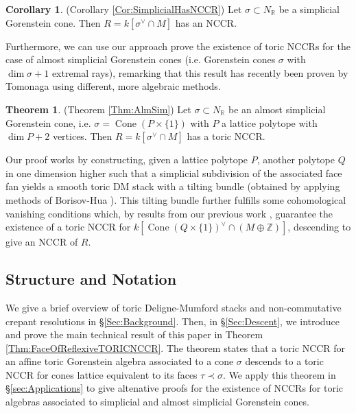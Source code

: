 \documentclass[reqno, 12pt]{amsart}
\theoremstyle{definition}
\newtheorem*{theorem*}{Theorem}
\newtheorem*{corollary*}{Corollary}
\numberwithin{equation}{section}
\newcommand{\newterm}{\textsf}
\newcommand{\Z}{\mathbb{Z}}
\newcommand{\R}{\mathbb{R}}
\newcommand{\cone}{\operatorname{Cone}}
\begin{document}
 \begin{corollary*}(Corollary \ref{Cor:SimplicialHasNCCR})
    Let $\sigma\subset N_{\R}$ be a simplicial Gorenstein cone. Then $R=k[\sigma^\vee\cap M]$ has an NCCR.
\end{corollary*}

Furthermore, we can use our approach prove the existence of toric NCCRs for the case of \newterm{almost simplicial} Gorenstein cones (i.e. Gorenstein cones $\sigma$ with $\dim \sigma+1$ extremal rays), remarking that this result has recently been proven by Tomonaga \cite{Tomo25} using different, more algebraic methods.

\begin{theorem*}(Theorem \ref{Thm:AlmSim})
    Let $\sigma\subset N_\R$ be an almost simplicial Gorenstein cone, i.e. $\sigma=\cone(P\times\{1\})$ with $P$ a lattice polytope with $\dim P+2$ vertices. Then $R=k[\sigma^\vee\cap M]$ has a toric NCCR.
\end{theorem*}

\noindent Our proof works by constructing, given a lattice polytope $P$, another polytope $Q$ in one dimension higher such that a simplicial subdivision of the associated face fan yields a smooth toric DM stack with a tilting bundle (obtained by applying methods of Borisov-Hua \cite{BH09}). This tilting bundle further fulfills some cohomological vanishing conditions which, by results from our previous work \cite{MS25}, guarantee the existence of a toric NCCR for $k[\cone(Q\times\{1\})^\vee\cap (M\oplus \Z)]$, descending to give an NCCR of $R$.




\subsection{Structure and Notation}

We give a brief overview of toric Deligne-Mumford stacks and non-commutative crepant resolutions in \S\ref{Sec:Background}. Then, in \S\ref{Sec:Descent}, we introduce and prove the main technical result of this paper in Theorem \ref{Thm:FaceOfReflexiveTORICNCCR}. The theorem states that a toric NCCR for an affine toric Gorenstein algebra associated to a cone $\sigma$ descends to a toric NCCR for cones lattice equivalent to its faces $\tau\prec \sigma$. We apply this theorem in \S\ref{sec:Applications} to give altenative proofs for the existence of NCCRs for toric algebras associated to simplicial and almost simplicial Gorenstein cones.
\end{document}
